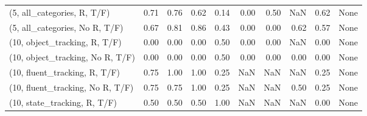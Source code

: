 \begin{table*}[h!]
\begin{adjustbox}{width=2\columnwidth,center}
\begin{tabular}{lrrr|rrr|rrr}
(5, all\_categories, R, T/F)          &                      0.71 &                  0.76 &                      0.62 &                          0.14 &                      0.00 &                          0.50 &                                    NaN &                               0.62 &                                  None \\
(5, all\_categories, No R, T/F)       &                      0.67 &                  0.81 &                      0.86 &                          0.43 &                      0.00 &                          0.00 &                                   0.62 &                               0.57 &                                  None \\



\midrule
(10, object\_tracking, R, T/F)         &                      0.00 &                  0.00 &                      0.00 &                          0.50 &                      0.00 &                          0.00 &                                    NaN &                               0.00 &                                  None \\
(10, object\_tracking, No R, T/F)      &                      0.00 &                  0.00 &                      0.00 &                          0.50 &                      0.00 &                          0.00 &                                   0.00 &                               0.00 &                                  None \\
(10, fluent\_tracking, R, T/F)         &                      0.75 &                  1.00 &                      1.00 &                          0.25 &                       NaN &                           NaN &                                    NaN &                               0.25 &                                  None \\
(10, fluent\_tracking, No R, T/F)      &                      0.75 &                  0.75 &                      1.00 &                          0.25 &                       NaN &                           NaN &                                   0.50 &                               0.25 &                                  None \\
(10, state\_tracking, R, T/F)          &                      0.50 &                  0.50 &                      0.50 &                          1.00 &                       NaN &                           NaN &                                    NaN &                               0.00 &                                  None \\

\end{tabular}
\end{adjustbox}
\end{table*}
